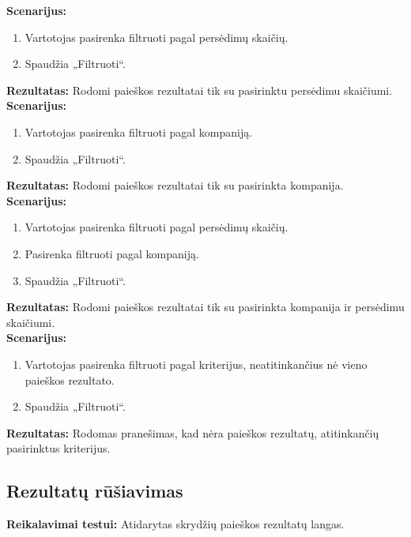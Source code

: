 \documentclass{VUMIFPSkursinis}
\begin{document}
            \noindent\textbf{Scenarijus:}
                \begin{enumerate}
                    \item Vartotojas pasirenka filtruoti pagal persėdimų skaičių.
                    \item Spaudžia „Filtruoti“.
                \end{enumerate}
            \textbf{Rezultatas:} Rodomi paieškos rezultatai tik su pasirinktu persėdimu skaičiumi.\\

            \noindent\textbf{Scenarijus:}
                \begin{enumerate}
                    \item Vartotojas pasirenka filtruoti pagal kompaniją.
                    \item Spaudžia „Filtruoti“.
                \end{enumerate}
            \textbf{Rezultatas:} Rodomi paieškos rezultatai tik su pasirinkta kompanija.\\

            \noindent\textbf{Scenarijus:}
                \begin{enumerate}
                    \item Vartotojas pasirenka filtruoti pagal persėdimų skaičių.
                    \item Pasirenka filtruoti pagal kompaniją.
                    \item Spaudžia „Filtruoti“.
                \end{enumerate}
            \textbf{Rezultatas:} Rodomi paieškos rezultatai tik su pasirinkta kompanija ir persėdimu skaičiumi.\\

            \noindent\textbf{Scenarijus:}
                \begin{enumerate}
                    \item Vartotojas pasirenka filtruoti pagal kriterijus, neatitinkančius nė vieno paieškos rezultato.
                    \item Spaudžia „Filtruoti“.
                \end{enumerate}
            \textbf{Rezultatas:} Rodomas pranešimas, kad nėra paieškos rezultatų, atitinkančių pasirinktus kriterijus.\\

        \subsection{Rezultatų rūšiavimas}
            \noindent\textbf{Reikalavimai testui:} Atidarytas skrydžių paieškos rezultatų langas. \\
\end{document}
